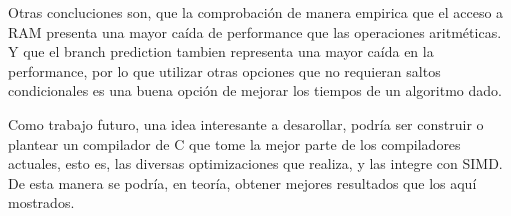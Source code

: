 \documentclass[a4paper]{article}
\begin{document}
Otras concluciones son, que la comprobación de manera empirica que el acceso a RAM presenta una mayor caída de performance que las operaciones aritméticas. Y que el branch prediction tambien representa una mayor caída en la performance, por lo que utilizar otras opciones que no requieran saltos condicionales es una buena opción de mejorar los tiempos de un algoritmo dado.

Como trabajo futuro, una idea interesante a desarollar, podría ser construir o plantear un compilador de C que tome la mejor parte de los compiladores actuales, esto es, las diversas optimizaciones que realiza, y las integre con SIMD. De esta manera se podría, en teoría, obtener mejores resultados que los aquí mostrados.
\end{document}
